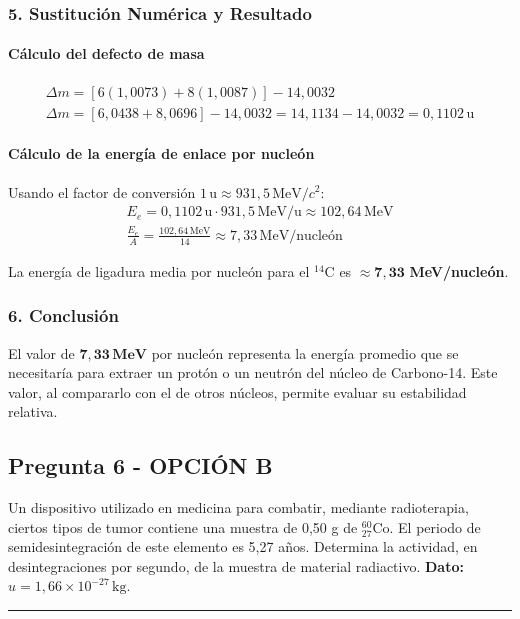 \subsubsection*{5. Sustitución Numérica y Resultado}
\paragraph*{Cálculo del defecto de masa}
\begin{gather}
    \Delta m = [6(1,0073) + 8(1,0087)] - 14,0032 \\
    \Delta m = [6,0438 + 8,0696] - 14,0032 = 14,1134 - 14,0032 = 0,1102 \, \text{u}
\end{gather}
\paragraph*{Cálculo de la energía de enlace por nucleón}
Usando el factor de conversión $1 \, \text{u} \approx 931,5 \, \text{MeV}/c^2$:
\begin{gather}
    E_e = 0,1102 \, \text{u} \cdot 931,5 \, \text{MeV/u} \approx 102,64 \, \text{MeV} \\
    \frac{E_e}{A} = \frac{102,64 \, \text{MeV}}{14} \approx 7,33 \, \text{MeV/nucleón}
\end{gather}
\begin{cajaresultado}
    La energía de ligadura media por nucleón para el ${}^{14}\text{C}$ es $\boldsymbol{\approx 7,33}$ \textbf{MeV/nucleón}.
\end{cajaresultado}

\subsubsection*{6. Conclusión}
\begin{cajaconclusion}
El valor de $\mathbf{7,33 \, MeV}$ por nucleón representa la energía promedio que se necesitaría para extraer un protón o un neutrón del núcleo de Carbono-14. Este valor, al compararlo con el de otros núcleos, permite evaluar su estabilidad relativa.
\end{cajaconclusion}

\newpage

\subsection{Pregunta 6 - OPCIÓN B}
\label{subsec:6B_2003_jun_ord}

\begin{cajaenunciado}
Un dispositivo utilizado en medicina para combatir, mediante radioterapia, ciertos tipos de tumor contiene una muestra de 0,50 g de ${}^{60}_{27}\text{Co}$. El periodo de semidesintegración de este elemento es 5,27 años. Determina la actividad, en desintegraciones por segundo, de la muestra de material radiactivo.
\textbf{Dato:} $u=1,66\times10^{-27}\,\text{kg}$.
\end{cajaenunciado}
\hrule

